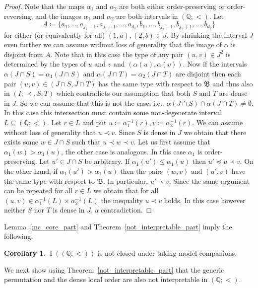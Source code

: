 \documentclass{amsart}
\theoremstyle{definition}
\newtheorem{corollary}[theorem]{Corollary}
\theoremstyle{remark}
\numberwithin{equation}{section}
\DeclareMathOperator{\I}{\operatorname{I}}
\newcommand{\fb}{\mathfrak{B}}
\begin{document}
\begin{proof}
	Note that the maps $\alpha_1$ and $\alpha_2$ are both either order-preserving or order-reversing, and the images $\alpha_1$ and $\alpha_2$ are both intervals in $(\mathbb{Q};<)$. Let $$A\coloneqq \{a_1,\dots,a_{j_1-1},a_{j_1+1},\dots,a_{d_1},b_1,\dots,b_{j_2-1},b_{j_2+1},\dots,b_{d_2}\}$$ for either (or equivalently for all) $(1,a),(2,b)\in J$. By shrinking the interval $J$ even further we can assume without loss of generality that the image of $\alpha$ is disjoint from $A$. Note that in this case the type of any pair $(u,v)\in J^2$ is determined by the types of $u$ and $v$ and $(\alpha(u),\alpha(v))$. Now if the intervals $\alpha(J\cap S)=\alpha_1(J\cap S)$ and $\alpha(J\cap T)=\alpha_2(J\cap T)$ are disjoint then each pair $(u,v)\in (J\cap S,J\cap T)$ has the same type {with respect to} $\fb$ and thus also in $(I;\prec,S,T)$ which contradicts our assumption that both $S$ and $T$ are dense in $J$. So we can assume that this is not the case, {i.e., $\alpha(J\cap S)\cap \alpha(J\cap T)\neq \emptyset$. {In this case this intersection must contain some non-degenerate interval $L\subseteq (\mathbb{Q};<)$}. Let $r\in {L}$} and put $u\coloneqq \alpha_1^{-1}(r),v\coloneqq \alpha_2^{-1}(r)$. We can assume without loss of generality that $u\prec v$. Since {$S$ is dense} in $J$ we obtain that there exists some $w\in J\cap S$ such that $u\prec w\prec v$. Let us first assume that $\alpha_1(w)>\alpha_1(u)$, the other case is analogous. In this case $\alpha_1$ is order-preserving. Let $u'\in J\cap S$ be arbitrary. If $\alpha_1(u')\leq \alpha_1(u)$ then $u'\preceq u\prec v$. On the other hand, if $\alpha_1(u')>\alpha_1(u)$ then the pairs $(w,v)$ and $(u',v)$ have the same type with respect to $\fb$. In particular, $u'\prec v$. Since the same argument can be repeated for all ${r\in L}$ we obtain that for all $(u,v)\in {\alpha_1^{-1}(L)\times \alpha_2^{-1}(L)}$ the inequality $u\prec v$ holds. In this case however neither $S$ nor $T$ is dense in $J$, a contradiction.
\end{proof}

	Lemma~\ref{mc_core_part} and Theorem~\ref{not_interpretable_part} imply the following.
	
\begin{corollary}\label{not_closed_mc_q}
	$\I((\mathbb{Q};<))$ is not closed under taking model companions.
\end{corollary}

	We next show using Theorem~\ref{not_interpretable_part} that the generic permutation and the dense local order are also not interpretable in $(\mathbb{Q};<)$. 
\end{document}

